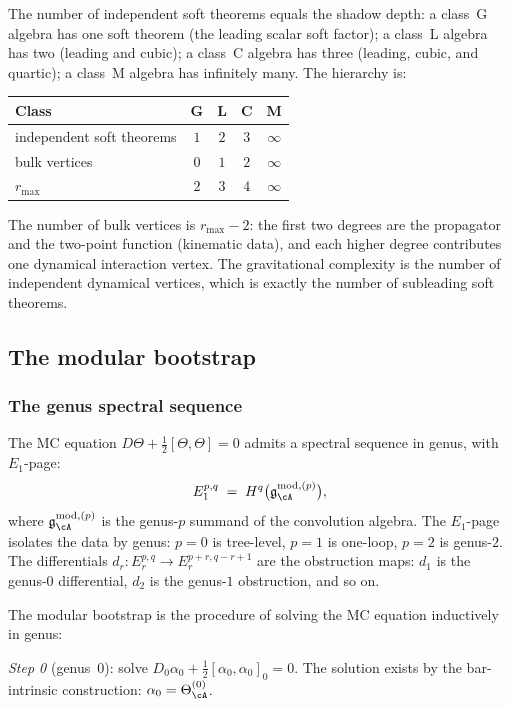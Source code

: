 The number of independent soft theorems equals the shadow depth:
a class~G algebra has one soft theorem (the leading scalar soft
factor); a class~L algebra has two (leading and cubic); a class~C
algebra has three (leading, cubic, and quartic); a class~M algebra
has infinitely many. The hierarchy is:
\begin{center}
\renewcommand{\arraystretch}{1.15}
\begin{tabular}{lcccc}
\textbf{Class} & G & L & C & M \\
\hline
independent soft theorems & $1$ & $2$ & $3$ & $\infty$ \\
bulk vertices & $0$ & $1$ & $2$ & $\infty$ \\
$r_{\max}$ & $2$ & $3$ & $4$ & $\infty$
\end{tabular}
\end{center}
The number of bulk vertices is $r_{\max}-2$: the first two degrees
are the propagator and the two-point function (kinematic data),
and each higher degree contributes one dynamical interaction vertex.
The gravitational complexity is the number of independent dynamical
vertices, which is exactly the number of subleading soft theorems.


\subsection*{The modular bootstrap}

\subsubsection*{The genus spectral sequence}

The MC equation $D\Theta+\frac{1}{2}[\Theta,\Theta]=0$ admits a
spectral sequence in genus, with $E_1$-page:
\[
E_1^{p,q}
\;=\;
H^q\bigl(\mathfrak{g}_{\cA}^{\mathrm{mod},(p)}\bigr),
\]
where $\mathfrak{g}_{\cA}^{\mathrm{mod},(p)}$ is the genus-$p$ summand of the convolution
algebra. The $E_1$-page isolates the data by genus:
$p=0$ is tree-level, $p=1$ is one-loop, $p=2$ is genus-$2$. The
differentials $d_r\colon E_r^{p,q}\to E_r^{p+r,q-r+1}$ are the
obstruction maps: $d_1$ is the genus-$0$ differential, $d_2$ is
the genus-$1$ obstruction, and so on.

The modular bootstrap is the procedure of solving the MC equation
inductively in genus:

\smallskip\noindent
\emph{Step 0} (genus~$0$): solve
$D_0\alpha_0+\frac{1}{2}[\alpha_0,\alpha_0]_0=0$. The
solution exists by the bar-intrinsic construction:
$\alpha_0=\Theta_\cA^{(0)}$.

